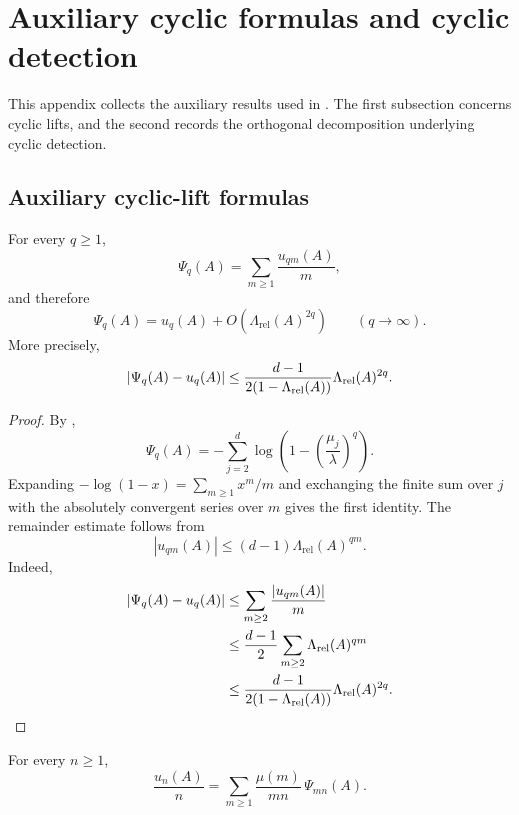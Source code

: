 \section{Auxiliary cyclic formulas and cyclic detection}
\label{app:supplementary}

This appendix collects the auxiliary results used in
. The first subsection concerns
cyclic lifts, and the second records the orthogonal decomposition
underlying cyclic detection.

\subsection{Auxiliary cyclic-lift formulas}

\begin{proposition}
  \label{prop:finite-part-cyclic-lift-dirichlet-multiple-sum}
  For every \(q\ge 1\),
  \[
    \Psi_q(A)=\sum_{m\ge 1}\frac{u_{qm}(A)}{m},
  \]
  and therefore
  \[
    \Psi_q(A)=u_q(A)+O\!\left(\Lambda_{\mathrm{rel}}(A)^{2q}\right)
    \qquad (q\to\infty).
  \]
  More precisely,
  \[
    \lvert \Psi_q(A)-u_q(A) \rvert
    \le
    \frac{d-1}{2(1-\Lambda_{\mathrm{rel}}(A))}
    \Lambda_{\mathrm{rel}}(A)^{2q}.
  \]
\end{proposition}

\begin{proof}
  By ,
  \[
    \Psi_q(A)
    =-\sum_{j=2}^d\log\!\left(1-\left(\frac{\mu_j}{\lambda}\right)^q\right).
  \]
  Expanding \(-\log(1-x)=\sum_{m\ge 1}x^m/m\) and exchanging the finite
  sum over \(j\) with the absolutely convergent series over \(m\) gives
  the first identity. The remainder estimate follows from
  \[
    |u_{qm}(A)|\le (d-1)\Lambda_{\mathrm{rel}}(A)^{qm}.
  \]
  Indeed,
  \[
    \begin{aligned}
      \lvert \Psi_q(A)-u_q(A) \rvert
      &\le
      \sum_{m\ge 2}\frac{\lvert u_{qm}(A) \rvert}{m} \\
      &\le
      \frac{d-1}{2}\sum_{m\ge 2}\Lambda_{\mathrm{rel}}(A)^{qm} \\
      &\le
      \frac{d-1}{2(1-\Lambda_{\mathrm{rel}}(A))}
      \Lambda_{\mathrm{rel}}(A)^{2q}.
    \end{aligned}
  \]
\end{proof}

\begin{proposition}
  \label{prop:finite-part-cyclic-lift-mobius-inversion}
  For every \(n\ge 1\),
  \[
    \frac{u_n(A)}{n}
    =\sum_{m\ge 1}\frac{\mu(m)}{mn}\,\Psi_{mn}(A).
  \]
\end{proposition}

